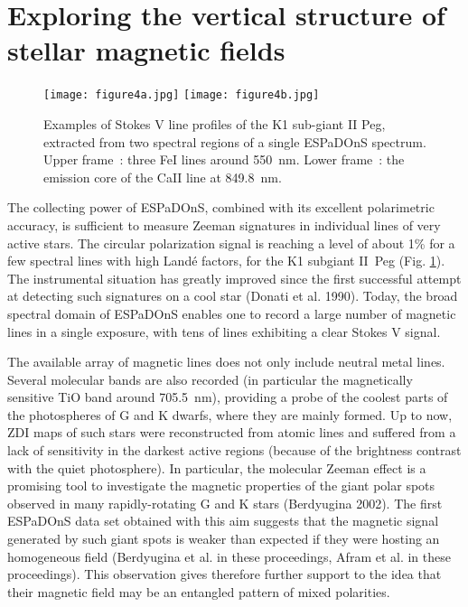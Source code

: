 \documentclass[11pt,twoside]{article}
\begin{document}
\section{Exploring the vertical structure of stellar magnetic fields}

\begin{figure}[t]
   \centering
   \texttt{[image: figure4a.jpg]}
   \texttt{[image: figure4b.jpg]}
   \caption{Examples of Stokes V line profiles of the K1 sub-giant II Peg, extracted from two spectral regions of a single ESPaDOnS spectrum. Upper frame~: three FeI lines around 550~nm. Lower frame~: the emission core of the CaII line at 849.8~nm.}
   \label{fig:lines}
\end{figure}

The collecting power of ESPaDOnS, combined with its excellent polarimetric accuracy, is sufficient to measure Zeeman signatures in individual lines of very active stars. The circular polarization signal is reaching a level of about 1\% for a few spectral lines with high Land\'e factors, for the K1 subgiant II~Peg (Fig. \ref{fig:lines}). The instrumental situation has greatly improved since the first successful attempt at detecting such signatures on a cool star (Donati et al. 1990). Today, the broad spectral domain of ESPaDOnS enables one to record a large number of magnetic lines in a single exposure, with tens of lines exhibiting a clear Stokes V signal. 

The available array of magnetic lines does not only include neutral metal lines. Several molecular bands are also recorded (in particular the magnetically sensitive TiO band around 705.5~nm), providing a probe of the coolest parts of the photospheres of G and K dwarfs, where they are mainly formed. Up to now, ZDI maps of such stars were reconstructed from atomic lines and suffered from a lack of sensitivity in the darkest active regions (because of the brightness contrast with the quiet photosphere). In particular, the molecular Zeeman effect is a promising tool to investigate the magnetic properties of the giant polar spots observed in many rapidly-rotating G and K stars (Berdyugina 2002). The first ESPaDOnS data set obtained with this aim suggests that the magnetic signal generated by such giant spots is weaker than expected if they were hosting an homogeneous field (Berdyugina et al. in these proceedings, Afram et al. in these proceedings). This observation gives therefore further support to the idea that their magnetic field may be an entangled pattern of mixed polarities. 
\end{document}
